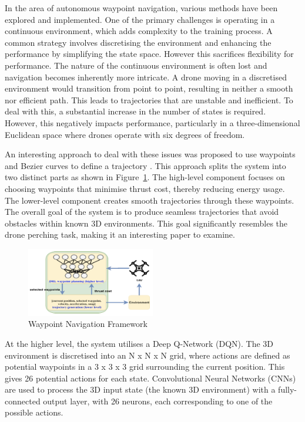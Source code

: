 In the area of autonomous waypoint navigation, various methods have been explored and implemented.
One of the primary challenges is operating in a continuous environment, which adds complexity to the training process.
A common strategy involves discretising the environment and enhancing the performance by simplifying the state space.
However this sacrifices flexibility for performance.
The nature of the continuous environment is often lost and navigation becomes inherently more intricate.
A drone moving in a discretised environment would transition from point to point, resulting in neither a smooth nor efficient path.
This leads to trajectories that are unstable and inefficient.
To deal with this, a substantial increase in the number of states is required.
However, this negatively impacts performance, particularly in a three-dimensional Euclidean space where drones operate with six degrees of freedom.

An interesting approach to deal with these issues was proposed to use waypoints and Bezier curves to define a trajectory \cite{fyp12-waypoint-navigation}.
This approach splits the system into two distinct parts as shown in Figure~\ref{fig:fyp12-waypoint-nav-framework}.
The high-level component focuses on choosing waypoints that minimise thrust cost, thereby reducing energy usage.
The lower-level component creates smooth trajectories through these waypoints.
The overall goal of the system is to produce seamless trajectories that avoid obstacles within known 3D environments.
This goal significantly resembles the drone perching task, making it an interesting paper to examine.

\begin{figure}[htbp]
  \centering
  \includegraphics[width=0.5\textwidth]{background/fyp12-waypoint-nav-framework.png}
  \caption{Waypoint Navigation Framework}
\label{fig:fyp12-waypoint-nav-framework}
\end{figure}

At the higher level, the system utilises a Deep Q-Network (DQN).
The 3D environment is discretised into an N x N x N grid, where actions are defined as potential waypoints in a 3 x 3 x 3 grid surrounding the current position.
This gives 26 potential actions for each state.
Convolutional Neural Networks (CNNs) are used to process the 3D input state (the known 3D environment) with a fully-connected output layer, with 26 neurons, each corresponding to one of the possible actions.

